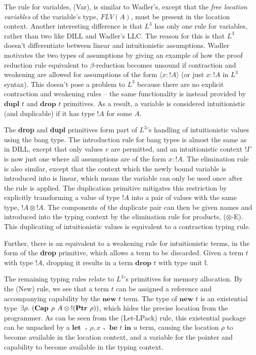 \documentclass[]{unswthesis}
\newcommand{\Exists}[1]{\exists #1 \ldotp \,}
\newcommand{\letbe}[3]{\textbf{let $#1$ be $#2$ in $#3$}}
\newcommand{\Ptr}[1]{\textbf{Ptr $#1$}}
\newcommand{\Capa}[2]{\textbf{Cap $#1$ $#2$}}
\newcommand{\lquine}{\left\ulcorner}
\newcommand{\rquine}{\right\urcorner}
\newcommand{\dupl}[1]{\textbf{dupl $#1$}}
\newcommand{\drop}[1]{\textbf{drop $#1$}}
\newcommand{\lnew}[1]{\textbf{new $#1$}}
\newcommand{\qpair}[2]{\lquine #1, #2 \rquine}
\let\i\textit
\let\b\textbf
\begin{document}
The rule for variables, (Var), is similar to Wadler's, except that the \i{free location variables} of the variable's type, $FLV(A)$, must be present in the location context. Another interesting difference is that $L^3$ has only one rule for variables, rather than two like DILL and Wadler's LLC. The reason for this is that $L^3$ doesn't differentiate between linear and intuitionistic assumptions. Wadler motivates the two types of assumptions by giving an example of how the proof reduction rule equivalent to $\beta$-reduction becomes unsound if contraction and weakening are allowed for assumptions of the form $\langle x : {!A} \rangle$ (or just $x : {!A}$ in $L^3$ syntax). This doesn't pose a problem to $L^3$ because there are no explicit contraction and weakening rules -- the same functionality is instead provided by $\dupl{t}$ and $\drop{t}$ primitives. As a result, a variable is considered intuitionistic (and duplicable) if it has type ${!A}$ for some $A$.

The \b{drop} and \b{dupl} primitives form part of $L^3$'s handling of intuitionistic values using the bang type. The introduction rule for bang types is almost the same as in DILL, except that only values $v$ are permitted, and an intuitionistic context $!\Gamma$ is now just one where all assumptions are of the form $x : {!A}$. The elimination rule is also similar, except that the context which the newly bound variable is introduced into is linear, which means the variable can only be used once after the rule is applied. The duplication primitive mitigates this restriction by explicitly transforming a value of type $!A$ into a pair of values with the same type, ${!A} \otimes {!A}$. The components of the duplicate pair can then be given names and introduced into the typing context by the elimination rule for products, ($\otimes$-E). This duplicating of intuitionistic values is equivalent to a contraction typing rule.

Further, there is an equivalent to a weakening rule for intuitionistic terms, in the form of the \b{drop} primitive, which allows a term to be discarded. Given a term $t$ with type ${!A}$, dropping it results in a term $\drop{t}$ with type unit $\mathds{I}$.

The remaining typing rules relate to $L^3$'s primitives for memory allocation. By the (New) rule, we see that a term $t$ can be assigned a reference and accompanying capability by the $\lnew{t}$ term. The type of $\lnew{t}$ is an existential type $\Exists{\rho} (\Capa{\rho}{A} \otimes {!(\Ptr{\rho})})$, which hides the precise location from the programmer. As can be seen from the (Let-LPack) rule, this existential package can be unpacked by a $\letbe{\qpair{\rho}{x}}{t}{u}$ term, causing the location $\rho$ to become available in the location context, and a variable for the pointer and capability to become available in the typing context.
\end{document}
